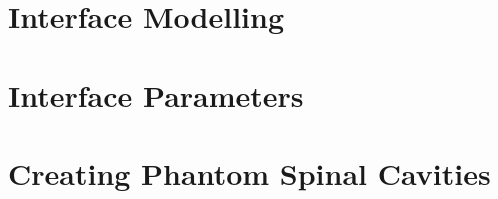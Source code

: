 
  \chapter{Interface Modelling}
    \label{chap:theInterfaceModel}
    


  \chapter{Interface Parameters}
    \label{chap:interfaceParameters}
    


  \chapter{Creating Phantom Spinal Cavities}
    \label{chap:fluid_mimicry}
    

